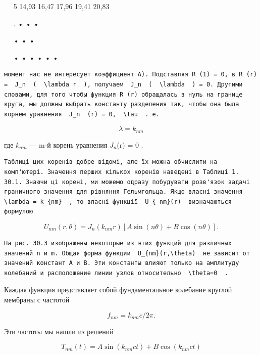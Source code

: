\documentclass[
  ukrainian,
]{article}
\begin{document}
~~\textbar{} 5 \textbar{} 14,93 \textbar{} 16,47 \textbar{} 17,96
\textbar{} 19,41 \textbar{} 20,83 \textbar{} \textbar{} \textbar{}

~~\textbar{} . \textbar{} • \textbar{} \textbar{} • \textbar{}
\textbar{} • \textbar{} \textbar{} \textbar{}

~~\textbar{} \textbar{} \textbar{} • \textbar{} \textbar{} • \textbar{}
• \textbar{} \textbar{} \textbar{}

~~\textbar{} • \textbar{} • \textbar{} • \textbar{} • \textbar{} •
\textbar{} • \textbar{} \textbar{} \textbar{}

\begin{verbatim}
момент нас не интересует коэффициент A). Подставляя R (1) = 0, в R (r) =  J_n  (  \lambda r  ), получаем  J_n  (  \lambda  ) = 0. Другими словами, для того чтобы функция R (r) обращалась в нуль на границе круга, мы должны выбрать константу разделения так, чтобы она была корнем уравнения  J_n  (r) = 0,  \tau  . e.
\end{verbatim}

\[
\lambda = k_{nm}
\]

где \(k_{nm}\) --- m-й корень уравнения \(J_n\)(r) = 0 .

\begin{verbatim}
Таблиці цих коренів добре відомі, але їх можна обчислити на комп'ютері. Значення перших кількох коренів наведені в Таблиці 1. 30.1. Знаючи ці корені, ми можемо одразу побудувати розв'язок задачі граничного значення для рівняння Гельмгольца. Якщо власні значення  \lambda = k_{nm}  , то власні функції  U_{ nm}(r)  визначаються формулою
\end{verbatim}

\[
U_{nm}(r, \theta) = J_n(k_{nm}r) [A \sin(n\theta) + B \cos(n\theta)].
\]

\begin{verbatim}
На рис. 30.3 изображены некоторые из этих функций для различных значений n и m. Общая форма функции  U_{nm}(r,\theta)  не зависит от значений констант A и B. Эти константы влияют только на амплитуду колебаний и расположение линии узлов относительно  \theta=0  .
\end{verbatim}

Каждая функция представляет собой фундаментальное колебание круглой
мембраны с частотой

\[
f_{nm} = k_{nm}c/2\pi.
\]

Эти частоты мы нашли из решений

\[
T_{nm}(t) = A \sin(k_{nm}ct) + B \cos(k_{nm}ct)
\]
\end{document}
